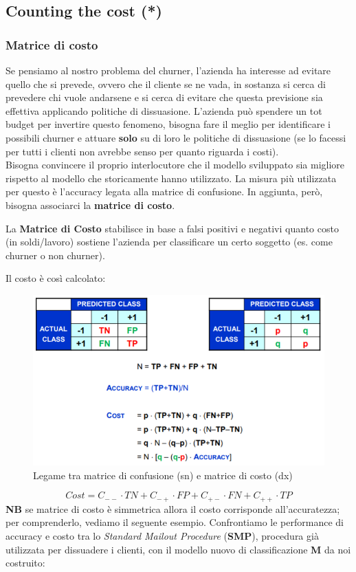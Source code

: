 \subsection{Counting the cost (*)}

\subsubsection{Matrice di costo}
Se pensiamo al nostro problema del churner, l'azienda ha interesse ad evitare quello che si prevede, ovvero che il cliente se ne vada, in sostanza si cerca di prevedere chi vuole andarsene e si cerca di evitare che questa previsione sia effettiva applicando politiche di dissuasione. L'azienda può spendere un tot budget per invertire questo fenomeno, bisogna fare il meglio per identificare i possibili churner e attuare \textbf{solo} su di loro le politiche di dissuasione (se lo facessi per tutti i clienti non avrebbe senso per quanto riguarda i costi).
\\Bisogna convincere il proprio interlocutore che il modello sviluppato sia migliore rispetto al modello che storicamente hanno utilizzato. La misura più utilizzata per questo è l'accuracy legata alla matrice di confusione. In aggiunta, però, bisogna associarci la \textbf{matrice di costo}. 

\begin{defn}
	La \textbf{Matrice di Costo} stabilisce in base a falsi positivi e negativi quanto costo (in soldi/lavoro) sostiene l'azienda per classificare un certo soggetto (es. come churner o non churner). 
\end{defn}
	Il costo è così calcolato:
\begin{figure}[H]
	\centering
	\includegraphics[height=0.55 \linewidth]{classification/pict/matr_costo.png}
	\caption{Legame tra matrice di confusione (sn) e matrice di costo (dx)}
\end{figure}
\[Cost = C_{--} \cdot TN + C_{-+} \cdot FP + C_{+-} \cdot FN + C_{++} \cdot TP\]
\textbf{NB} se matrice di costo è simmetrica allora il costo corrisponde all'accuratezza; per comprenderlo, vediamo il seguente esempio. Confrontiamo le performance di accuracy e costo tra lo \textit{Standard Mailout Procedure} (\textbf{SMP}), procedura già utilizzata per dissuadere i clienti, con il modello nuovo di classificazione \textbf{M} da noi costruito:

